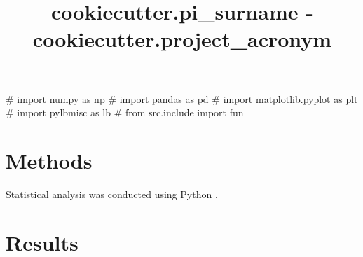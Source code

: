 \documentclass{article}
\begin{document}
\title{ {{cookiecutter.pi_surname}} - {{cookiecutter.project_acronym}} }
\maketitle
\tableofcontents
\begin{pycode}
# import numpy as np
# import pandas as pd
# import matplotlib.pyplot as plt
# import pylbmisc as lb
# from src.include import fun
\end{pycode}


\section{Methods}


Statistical analysis was conducted using Python \cite{python}.

\section{Results}






\printbibliography 
\end{document}
